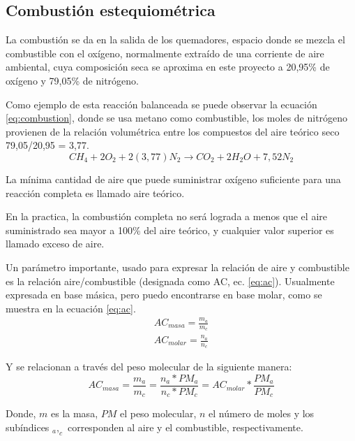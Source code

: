 \subsection{Combustión estequiométrica}
\par La combustión se da en la salida de los quemadores, espacio donde se mezcla el combustible con el oxígeno, normalmente extraído de una corriente de aire ambiental, cuya composición seca se aproxima en este proyecto a 20,95\% de oxígeno y 79,05\% de nitrógeno. 
\par Como ejemplo de esta reacción balanceada se puede observar la ecuación \ref{eq:combustion}, donde se usa metano como combustible, los moles de nitrógeno provienen de la relación volumétrica entre los compuestos del aire teórico seco 79,05/20,95 = 3,77.
\begin{equation}
    \label{eq:combustion}
    CH_4 + 2O_2 + 2(3,77)N_2 \rightarrow CO_2 + 2H_2O + 7,52N_2
\end{equation}
\par La mínima cantidad de aire que puede suministrar oxígeno suficiente para una reacción completa es llamado aire teórico.
\par En la practica, la combustión completa no será lograda a menos que el aire suministrado sea mayor a 100\% del aire teórico, y cualquier valor superior es llamado exceso de aire.
\par Un parámetro importante, usado para expresar la relación de aire y combustible es la relación aire/combustible (designada como AC, ec. \ref{eq:ac}). Usualmente expresada en base másica, pero puedo encontrarse en base molar, como se muestra en la ecuación \ref{eq:ac}.\\
\begin{gather} \label{eq:ac}
    AC_{masa} = \frac{m_{a}}{m_{c}}\\
    AC_{molar} = \frac{n_{a}}{n_{c}}
\end{gather}
\par Y se relacionan a través del peso molecular de la siguiente manera:
\begin{equation}
\label{eq:ac_rel}
    AC_{masa} = \frac{m_{a}}{m_{c}} =
    \frac{n_{a}*PM_{a}}{n_{c}*PM_{c}} = AC_{molar}*\frac{PM_{a}}{PM_{c}}
\end{equation}
\par Donde, $m$ es la masa, $PM$ el peso molecular, $n$ el número de moles y los subíndices $_a,_c$ corresponden al aire y el combustible, respectivamente.

